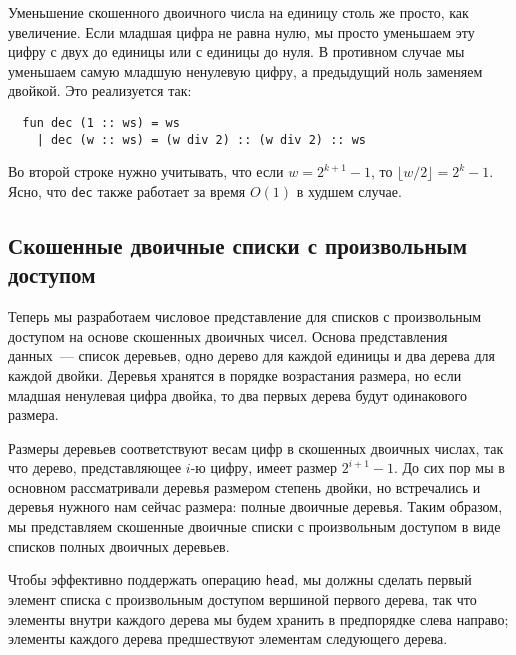 \begin{frame}[fragile]{}
Уменьшение скошенного двоичного числа на единицу столь же просто, как
увеличение. Если младшая цифра не равна нулю, мы просто уменьшаем эту
цифру с двух до единицы или с единицы до нуля. В противном случае мы
уменьшаем самую младшую ненулевую цифру, а предыдущий ноль заменяем
двойкой. Это реализуется так:
\begin{lstlisting}
  fun dec (1 :: ws) = ws
    | dec (w :: ws) = (w div 2) :: (w div 2) :: ws
\end{lstlisting}
Во второй строке нужно учитывать, что если $w = 2^{k+1} - 1$, то
$\lfloor w/2 \rfloor = 2^k - 1$. Ясно, что \lstinline!dec! также
работает за время $O(1)$ в худшем случае.

\subsection{Скошенные двоичные списки с произвольным доступом}
\label{sc:9.3.1}

Теперь мы разработаем числовое представление для списков с
произвольным доступом на основе скошенных двоичных чисел.  Основа
представления данных~--- список деревьев, одно дерево для каждой
единицы и два дерева для каждой двойки. Деревья хранятся в порядке
возрастания размера, но если младшая ненулевая цифра двойка, то два
первых дерева будут одинакового размера.

Размеры деревьев соответствуют весам цифр в скошенных двоичных числах,
так что дерево, представляющее $i$-ю цифру, имеет размер $2^{i+1} -
1$. До сих пор мы в основном рассматривали деревья размером степень
двойки, но встречались и деревья нужного нам сейчас размера: полные
двоичные деревья. Таким образом, мы представляем скошенные двоичные
списки с произвольным доступом в виде списков полных двоичных
деревьев.

Чтобы эффективно поддержать операцию \lstinline!head!, мы должны
сделать первый элемент списка с произвольным доступом вершиной первого
дерева, так что элементы внутри каждого дерева мы будем хранить в
предпорядке слева направо; элементы каждого дерева предшествуют
элементам следующего дерева.


\end{frame}
